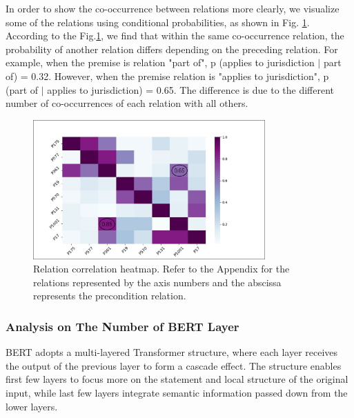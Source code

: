 \documentclass[preprint,12pt]{elsarticle}
\begin{document}
In order to show the co-occurrence between relations more clearly, we visualize some of the relations using conditional probabilities, as shown in Fig. \ref{fig.7}.  According to the Fig.\ref{fig.7}, we find that within the same co-occurrence relation, the probability of another relation differs depending on the preceding relation. For example, when the premise is relation "part of", p (applies to jurisdiction $\mid$ part of) = 0.32. However, when the premise relation is "applies to jurisdiction", p (part of $\mid$ applies to jurisdiction) = 0.65. The difference is due to the different number of co-occurrences of each relation with all others.

\begin{figure}[htbp]
\centering
\includegraphics[width=3.5in]{./Co-relation.png}
\caption{Relation correlation heatmap. Refer to the Appendix for the relations represented by the axis numbers and the abscissa represents the precondition relation.}
\label{fig.7}
\end{figure}

\subsubsection{Analysis on The Number of BERT Layer}\label{subsubsec12}
BERT adopts a multi-layered Transformer structure, where each layer receives the output of the previous layer to form a cascade effect. The structure enables first few layers to focus more on the statement and local structure of the original input, while last few layers integrate semantic information passed down from the lower layers. 
\begin{table}[htbp]\centering
\caption{Effect of the number of BERT layers used on the $F_1$ score in PrLMs}\label{tab5}
\end{table}
\end{document}
